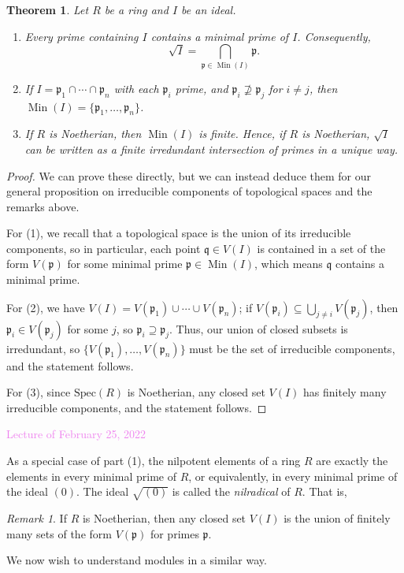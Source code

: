 \documentclass{amsart}[12pt]
\def\Min{\operatorname{Min}}
\newcommand{\Feb}[1]{\textcolor{violet}{Lecture of February #1, 2022}}
\newcommand{\p}{{\mathfrak p}}
\newcommand{\q}{{\mathfrak q}}
\newcommand{\DEF}[1]{\emph{#1}\index{#1}}
\numberwithin{equation}{section}
\theoremstyle{plain} %
\newtheorem{thm}[equation]{Theorem}
\theoremstyle{definition}
\theoremstyle{remark}
\newtheorem{rem}[equation]{Remark}
\newcommand{\Spec}{\mathrm{Spec}}
\begin{document}
\begin{thm}
Let $R$ be a ring and $I$ be an ideal.
\begin{enumerate}
\item Every prime containing $I$ contains a minimal prime of $I$. Consequently,
	\[\sqrt{I} = \bigcap_{\p\in \Min(I)} \p.\]
\item If $I=\p_1 \cap \cdots \cap \p_n$ with each $\p_i$ prime, and $\p_i \not\supseteq \p_j$ for $i\neq j$, then $\Min(I)=\{\p_1,\dots,\p_n\}$.
\item If $R$ is Noetherian, then $\Min(I)$ is finite. Hence, if $R$ is Noetherian, $\sqrt{I}$ can be written as a finite irredundant intersection of primes in a unique way.
\end{enumerate}
\end{thm}
\begin{proof}
We can prove these directly, but we can instead deduce them for our general proposition on irreducible components of topological spaces and the remarks above. 

For (1), we recall that a topological space is the union of its irreducible components, so in particular, each point $\q \in V(I)$ is contained in a set of the form $V(\p)$ for some minimal prime $\p\in \Min(I)$, which means $\q$ contains a minimal prime.

For (2), we have $V(I) = V(\p_1) \cup \cdots \cup V(\p_n)$; if $V(\p_i)\subseteq \bigcup_{j\neq i} V(\p_j)$, then $\p_i \in V(\p_j)$ for some $j$, so $\p_i \supseteq \p_j$. Thus, our union of closed subsets is irredundant, so $\{V(\p_1),\dots,V(\p_n)\}$ must be the set of irreducible components, and the statement follows.

For (3), since $\Spec(R)$ is Noetherian, any closed set $V(I)$ has finitely many irreducible components, and the statement follows.
\end{proof}

\Feb{25}

As a special case of part (1), the nilpotent elements of a ring $R$ are exactly the elements in every minimal prime of $R$, or equivalently, in every minimal prime of the ideal $(0)$. The ideal $\sqrt{(0)}$ is called the \DEF{nilradical} of $R$. That is,

\begin{rem} If $R$ is Noetherian, then any closed set $V(I)$ is the union of finitely many sets of the form $V(\p)$ for primes $\p$.
\end{rem}


We now wish to understand modules in a similar way. 
\end{document}
